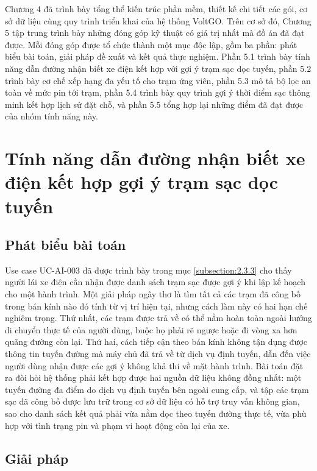 \documentclass[../Main.tex]{subfiles}
\begin{document}
Chương 4 đã trình bày tổng thể kiến trúc phần mềm, thiết kế chi tiết các gói, cơ sở dữ liệu cùng quy trình triển khai của hệ thống VoltGO. Trên cơ sở đó, Chương 5 tập trung trình bày những đóng góp kỹ thuật có giá trị nhất mà đồ án đã đạt được. Mỗi đóng góp được tổ chức thành một mục độc lập, gồm ba phần: phát biểu bài toán, giải pháp đề xuất và kết quả thực nghiệm. Phần 5.1 trình bày tính năng dẫn đường nhận biết xe điện kết hợp với gợi ý trạm sạc dọc tuyến, phần 5.2 trình bày cơ chế xếp hạng đa yếu tố cho trạm ứng viên, phần 5.3 mô tả bộ lọc an toàn về mức pin tới trạm, phần 5.4 trình bày quy trình gợi ý thời điểm sạc thông minh kết hợp lịch sử đặt chỗ, và phần 5.5 tổng hợp lại những điểm đã đạt được của nhóm tính năng này.

\section{Tính năng dẫn đường nhận biết xe điện kết hợp gợi ý trạm sạc dọc tuyến}
\label{section:5.1}

\subsection{Phát biểu bài toán}

Use case UC-AI-003 đã được trình bày trong mục \ref{subsection:2.3.3} cho thấy người lái xe điện cần nhận được danh sách trạm sạc được gợi ý khi lập kế hoạch cho một hành trình. Một giải pháp ngây thơ là tìm tất cả các trạm đã công bố trong bán kính nào đó tính từ vị trí hiện tại, nhưng cách làm này có hai hạn chế nghiêm trọng. Thứ nhất, các trạm được trả về có thể nằm hoàn toàn ngoài hướng di chuyển thực tế của người dùng, buộc họ phải rẽ ngược hoặc đi vòng xa hơn quãng đường còn lại. Thứ hai, cách tiếp cận theo bán kính không tận dụng được thông tin tuyến đường mà máy chủ đã trả về từ dịch vụ định tuyến, dẫn đến việc người dùng nhận được các gợi ý không khả thi về mặt hành trình. Bài toán đặt ra đòi hỏi hệ thống phải kết hợp được hai nguồn dữ liệu không đồng nhất: một tuyến đường đa điểm do dịch vụ định tuyến bên ngoài cung cấp, và tập các trạm sạc đã công bố được lưu trữ trong cơ sở dữ liệu có hỗ trợ truy vấn không gian, sao cho danh sách kết quả phải vừa nằm dọc theo tuyến đường thực tế, vừa phù hợp với tình trạng pin và phạm vi hoạt động còn lại của xe.

\subsection{Giải pháp}
\end{document}
